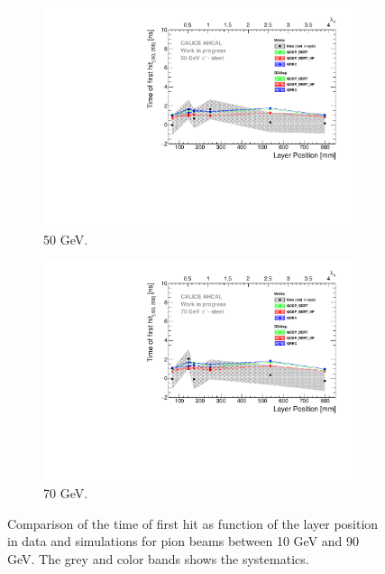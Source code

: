\begin{figure}[htbp!]
\begin{subfigure}[t]{0.5\textwidth}
    \includegraphics[width=1\textwidth]{../Thesis_Plots/Timing/Pions/Plots/ComparisonToSim/Time_Depth_50GeV.pdf}
    \caption{50 GeV.} \label{fig:Depth_SimData_50GeV}
  \end{subfigure}
  \hfill
  \begin{subfigure}[t]{0.5\textwidth}
    \centering
    \includegraphics[width=1\textwidth]{../Thesis_Plots/Timing/Pions/Plots/ComparisonToSim/Time_Depth_70GeV.pdf}
    \caption{70 GeV.} \label{fig:Depth_SimData_70GeV}
  \end{subfigure}
  \caption{Comparison of the time of first hit as function of the layer position in data and simulations for pion beams between 10 GeV and 90 GeV. The grey and color bands shows the systematics.}
\end{figure}

